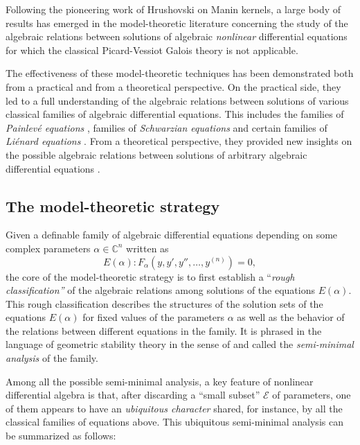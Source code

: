 \documentclass[12pt]{amsart}
\theoremstyle{definition}
\theoremstyle{plain}
\theoremstyle{exampstyle}
\theoremstyle{exampstyle}\newtheorem{thmxbis}{Theorem}
\numberwithin{equation}{section}
\theoremstyle{remark}
\begin{document}
 
Following the pioneering work of Hrushovski \cite{Hrushovski-MordellLang} on Manin kernels, a large body of results has emerged in the model-theoretic literature concerning the study of the algebraic relations between solutions of algebraic {\em nonlinear} differential equations for which the classical Picard-Vessiot Galois theory is not applicable. 

The effectiveness of these model-theoretic techniques has been demonstrated both from a practical and from a theoretical perspective. On the practical side, they led to a full understanding  of the algebraic relations between solutions of various classical families of algebraic differential equations. This includes the families of {\em Painlevé equations} \cite{Nagloo-Pillay1, Nagloo-Pillay2, Freitag-Nagloo}, families of {\em Schwarzian equations} \cite{Freitag-Scanlon, Casale-Freitag-Nagloo, BCFN} and certain families of {\em Liénard equations} \cite{FJMN}. From a theoretical perspective, they provided  new insights on the possible algebraic relations between solutions of arbitrary algebraic differential equations \cite{Freitag-Jaoui-Moosa}. 


\subsection{The model-theoretic strategy} Given a definable family of algebraic differential equations depending on some complex parameters $\alpha \in \mathbb{C}^n$  written as
$$E(\alpha) : F_\alpha(y,y',y'', \ldots, y^{(n)}) = 0,$$
the core of the model-theoretic strategy is to first establish a ``{\em{rough classification''}} of the algebraic relations among solutions of the equations $E(\alpha)$. This rough classification describes the structures of the solution sets of the equations $E(\alpha)$ for fixed values of the parameters $\alpha$ as well as the behavior of the relations between different equations in the family. It is phrased in the language of geometric stability theory in the sense of  \cite{Pillay} and called the {\em{semi-minimal analysis}} of the family.

Among all the possible semi-minimal analysis, a key feature of nonlinear differential algebra is that, after discarding a ``small subset'' $\mathcal E$ of parameters, one of them appears to have an {\em ubiquitous character} shared, for instance, by all the classical families of equations  above. This ubiquitous semi-minimal analysis can be summarized as follows: 
\end{document}
